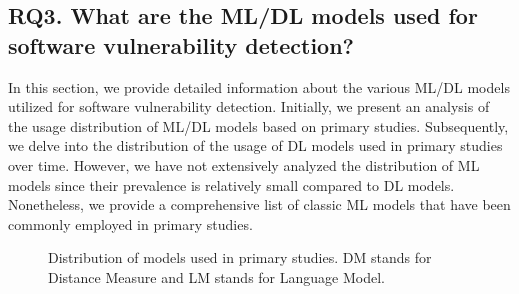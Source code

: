 \subsection{RQ3. What are the ML/DL models used for software vulnerability detection?}

{In this section, we provide detailed information about the various ML/DL models utilized for software vulnerability detection. Initially, we present an analysis of the usage distribution of ML/DL models based on primary studies. Subsequently, we delve into the distribution of the usage of DL models used in primary studies over time. However, we have not extensively analyzed the distribution of ML models since their prevalence is relatively small compared to DL models. Nonetheless, we provide a comprehensive list of classic ML models that have been commonly employed in primary studies.}


\begin{figure}[t!]
\centering
{}
\caption{Distribution of models used in primary studies. DM stands for Distance Measure and LM stands for Language Model.}
\label{fig:models}
\end{figure}
 


